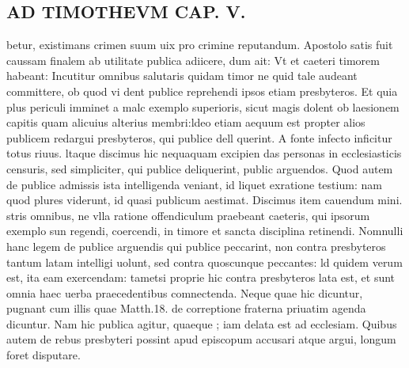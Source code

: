 \documentclass{article}
\begin{document}
\begin{pages}
\section*{AD TIMOTHEVM CAP. V. }
\marginpar{[ p.115 ]}\pstart betur, existimans crimen suum uix pro crimine reputandum. Apostolo satis fuit caussam finalem ab utilitate publica adiicere, dum ait: Vt et caeteri timorem habeant: Incutitur omnibus salutaris quidam timor ne quid tale audeant committere, ob quod vi dent publice reprehendi ipsos etiam presbyteros. Et quia plus periculi imminet a malc exemplo superioris, sicut magis dolent ob laesionem capitis quam alicuius alterius membri:ldeo etiam aequum est propter alios publicem redargui presbyteros, qui publice dell querint. A fonte infecto inficitur totus riuus. ltaque discimus hic nequaquam excipien das personas in ecclesiasticis censuris, sed simpliciter, qui publice deliquerint, public arguendos. Quod autem de publice admissis ista intelligenda veniant, id liquet exratione testium: nam quod plures viderunt, id quasi publicum aestimat. Discimus item cauendum mini. stris omnibus, ne vlla ratione offendiculum praebeant caeteris, qui ipsorum exemplo sun regendi, coercendi, in timore et sancta disciplina retinendi. Nomnulli hanc legem de publice arguendis qui publice peccarint, non contra presbyteros tantum latam intelligi uolunt, sed contra quoscunque peccantes: ld quidem verum est, ita eam exercendam: tametsi proprie hic contra presbyteros lata est, et sunt omnia haec uerba praecedentibus comnectenda. Neque  quae hic dicuntur, pugnant cum illis quae Matth.18. de correptione fraterna priuatim agenda dicuntur. Nam hic publica agitur, quaeque ; iam delata est ad ecclesiam. Quibus autem de rebus presbyteri possint apud episcopum accusari atque argui, longum foret disputare.  \pend
{}
{}

\end{pages}
\end{document}
